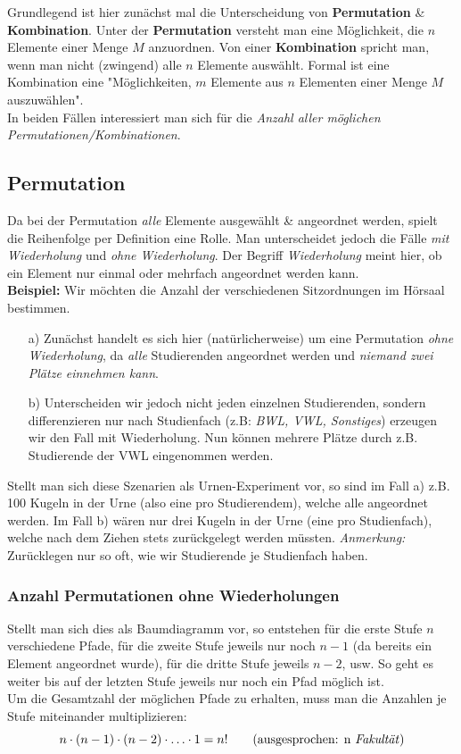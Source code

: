 \documentclass[a4paper]{article}
\begin{document}
Grundlegend ist hier zunächst mal die Unterscheidung von \textbf{Permutation} \& \textbf{Kombination}.
Unter der \textbf{Permutation} versteht man eine Möglichkeit, die $n$ Elemente einer Menge $M$ anzuordnen. Von einer \textbf{Kombination} spricht man, wenn man nicht (zwingend) alle $n$ Elemente auswählt. Formal ist eine Kombination eine "Möglichkeiten, $m$ Elemente aus $n$ Elementen einer Menge $M$ auszuwählen".\\
In beiden Fällen interessiert man sich für die \textit{Anzahl aller möglichen Permutationen/Kombinationen}.

\subsection{Permutation}\label{sec:perm}
Da bei der Permutation \textit{alle} Elemente ausgewählt \& angeordnet werden, spielt die Reihenfolge per Definition eine Rolle. Man unterscheidet jedoch die Fälle \textit{mit Wiederholung} und \textit{ohne Wiederholung}. Der Begriff \textit{Wiederholung} meint hier, ob ein Element nur einmal oder mehrfach angeordnet werden kann.\\
\textbf{Beispiel:} Wir möchten die Anzahl der verschiedenen Sitzordnungen im Hörsaal bestimmen.
\begin{itemize}
    \item[a)] Zunächst handelt es sich hier (natürlicherweise) um eine Permutation \textit{ohne Wiederholung}, da \textit{alle} Studierenden angeordnet werden und \textit{niemand zwei Plätze einnehmen kann}.
    \item[b)] Unterscheiden wir jedoch nicht jeden einzelnen Studierenden, sondern differenzieren nur nach Studienfach (z.B: \textit{BWL, VWL, Sonstiges}) erzeugen wir den Fall mit Wiederholung. Nun können mehrere Plätze durch z.B. Studierende der VWL eingenommen werden.
\end{itemize}
Stellt man sich diese Szenarien als Urnen-Experiment vor, so sind im Fall a) z.B. 100 Kugeln in der Urne (also eine pro Studierendem), welche alle angeordnet werden. Im Fall b) wären nur drei Kugeln in der Urne (eine pro Studienfach), welche nach dem Ziehen stets zurückgelegt werden müssten. \textit{Anmerkung:} Zurücklegen nur so oft, wie wir Studierende je Studienfach haben.

\subsubsection{Anzahl Permutationen ohne Wiederholungen}\label{sec:perm-ohne}
Stellt man sich dies als Baumdiagramm vor, so entstehen für die erste Stufe $n$ verschiedene Pfade, für die zweite Stufe jeweils nur noch $n-1$ (da bereits ein Element angeordnet wurde), für die dritte Stufe jeweils $n-2$, usw. So geht es weiter bis auf der letzten Stufe jeweils nur noch ein Pfad möglich ist.\\
Um die Gesamtzahl der möglichen Pfade zu erhalten, muss man die Anzahlen je Stufe miteinander multiplizieren: 
$$n \cdot (n-1) \cdot (n-2) \cdot \hdots \cdot 1 = n! \qquad \mbox{(ausgesprochen: n \textit{Fakultät})}$$
\end{document}
